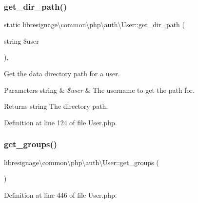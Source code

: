 \subsubsection{\texorpdfstring{get\+\_\+dir\+\_\+path()}{get\_dir\_path()}}
{\footnotesize\ttfamily static libresignage\textbackslash{}common\textbackslash{}php\textbackslash{}auth\textbackslash{}\+User\+::get\+\_\+dir\+\_\+path (\begin{DoxyParamCaption}\item[{string}]{\$user }\end{DoxyParamCaption})\hspace{0.3cm}{\ttfamily [static]}, {\ttfamily [private]}}

Get the data directory path for a user.


\begin{DoxyParams}[1]{Parameters}
string & {\em \$user} & The username to get the path for.\\
\hline
\end{DoxyParams}
\begin{DoxyReturn}{Returns}
string The directory path. 
\end{DoxyReturn}


Definition at line 124 of file User.\+php.

\mbox{\label{classlibresignage_1_1common_1_1php_1_1auth_1_1User_a400eaa5ab78f2adea417ca51e10c7343}} 
\subsubsection{\texorpdfstring{get\+\_\+groups()}{get\_groups()}}
{\footnotesize\ttfamily libresignage\textbackslash{}common\textbackslash{}php\textbackslash{}auth\textbackslash{}\+User\+::get\+\_\+groups (\begin{DoxyParamCaption}{ }\end{DoxyParamCaption})}



Definition at line 446 of file User.\+php.

\mbox{\label{classlibresignage_1_1common_1_1php_1_1auth_1_1User_a44cb3b60aaa0fa11a90b23fb6dd205f9}} 

